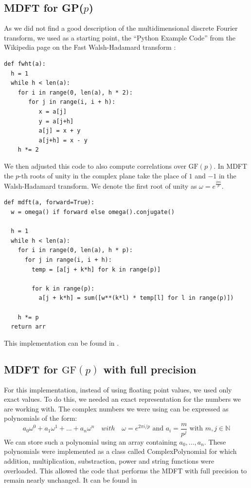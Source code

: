 \documentclass{report}
\newcommand{\GF}{\text{GF}}
\begin{document}
\subsection{MDFT for GP($p$)}
As we did not find a good description of the multidimensional discrete Fourier transform, we used as a starting point, the ``Python Example Code'' from the Wikipedia page on the Fast Walsh-Hadamard transform \cite{wiki2018transform}:
\begin{verbatim}
def fwht(a):
  h = 1
  while h < len(a):
    for i in range(0, len(a), h * 2):
       for j in range(i, i + h):
          x = a[j]
          y = a[j+h]
          a[j] = x + y
          a[j+h] = x - y
    h *= 2
\end{verbatim}

We then adjusted this code to also compute correlations over $\GF(p)$. In MDFT the $p$-th roots of unity in the complex plane take the place of $1$ and $-1$ in the Walsh-Hadamard transform. We denote the first root of unity as $\omega = e^{\frac{2\pi i}{p}}$.

\begin{verbatim}
def mdft(a, forward=True):
  w = omega() if forward else omega().conjugate()
  
  h = 1
  while h < len(a):
    for i in range(0, len(a), h * p):
      for j in range(i, i + h):
        temp = [a[j + k*h] for k in range(p)]

        for k in range(p):
          a[j + k*h] = sum([w**(k*l) * temp[l] for l in range(p)])

    h *= p
  return arr
\end{verbatim}
This implementation can be found in .

\subsection{MDFT for $\GF(p)$ with full precision}

For this implementation, instead of using floating point values, we used only exact values.
To do this, we needed an exact representation for the numbers we are working with.
The complex numbers we were using can be expressed as polynomials of the form:
\begin{equation*}
a_0\omega^0 + a_1\omega^1 + \dots + a_n\omega^n \quad with \quad \omega = e^{2\pi i/p} \text{ and } a_i = \frac{m}{p^j} \text{ with }  m, j \in \mathbb{N}
\end{equation*}
We can store such a polynomial using an array containing $a_0, \dots, a_n$. 
These polynomials were implemented as a class called ComplexPolynomial for which addition, multiplication, substraction, power and string functions were overloaded. This allowed the code that performs the MDFT with full precision to remain nearly unchanged. It can be found in \\
\end{document}
